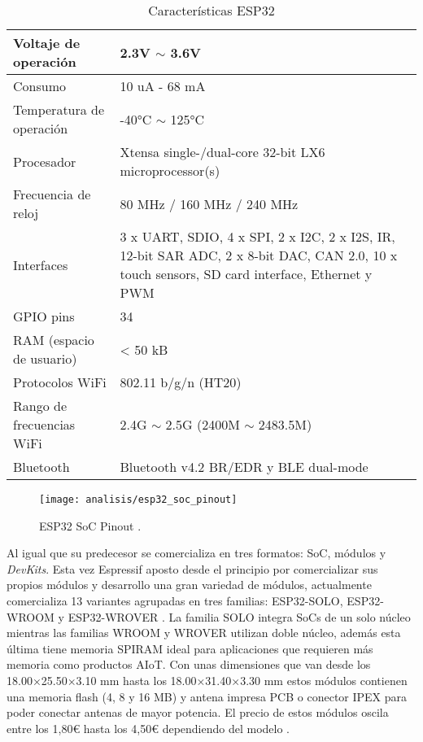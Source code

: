 \documentclass[../proyecto.tex]{subfiles}
\begin{document}
\begin{table}[H]
\centering
\begin{tabular}{ |l|m{20em}| }
\hline
Voltaje de operación      & 2.3V $\sim$ 3.6V          \\ \hline
Consumo                   & 10 uA - 68 mA  \\ \hline
Temperatura de operación  & -40°C $\sim$ 125°C        \\ \hline
Procesador                & Xtensa single-/dual-core 32-bit LX6 microprocessor(s)   \\ \hline
Frecuencia de reloj       & 80 MHz / 160 MHz  / 240 MHz        \\ \hline
Interfaces                & 3 x UART, SDIO, 4 x SPI, 2 x I2C, 2 x I2S, IR, 12-bit SAR ADC, 2 x 8-bit DAC, CAN 2.0, 10 x touch sensors, SD card interface, Ethernet y PWM                           \\ \hline
GPIO pins                 & 34                        \\ \hline
RAM (espacio de usuario)  & < 50 kB                     \\ \hline
Protocolos WiFi           & 802.11 b/g/n (HT20)       \\ \hline
Rango de frecuencias WiFi & 2.4G $\sim$ 2.5G (2400M $\sim$ 2483.5M) \\ \hline
Bluetooth           &  Bluetooth v4.2 BR/EDR y BLE dual-mode  \\ \hline
\end{tabular}
\caption{Características ESP32}
\label{table:caracteristicas_esp32}
\end{table}

\begin{figure}[H]
\centering
\texttt{[image: analisis/esp32\_soc\_pinout]}
\caption{ESP32 SoC Pinout  \cite{esp32_soc_pinout}.}
\label{fig:esp32_soc_pinout}
\end{figure}

Al igual que su predecesor se comercializa en tres formatos: SoC, módulos y \textit{DevKits}. Esta vez Espressif aposto desde el principio por comercializar sus propios módulos y desarrollo una gran variedad de módulos, actualmente comercializa 13 variantes agrupadas en tres familias: ESP32-SOLO, ESP32-WROOM y ESP32-WROVER \cite{espressif_products_ordering_information}. La familia SOLO integra SoCs de un solo núcleo mientras las familias WROOM y WROVER utilizan doble núcleo, además esta última tiene memoria SPIRAM ideal para aplicaciones que requieren más memoria como productos AIoT. Con unas dimensiones que van desde los 18.00×25.50×3.10 mm hasta los 18.00×31.40×3.30 mm estos módulos contienen una memoria flash (4, 8 y 16 MB) y antena impresa PCB o conector IPEX para poder conectar antenas de mayor potencia. El precio de estos módulos oscila entre los 1,80€ hasta los 4,50€ dependiendo del modelo \cite{espressif_provider_digikey} \cite{espressif_provider_mouser}.\\
\end{document}
